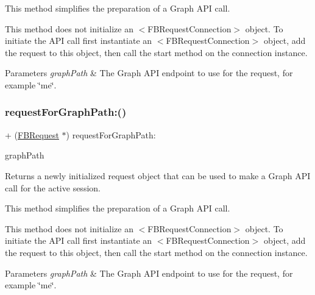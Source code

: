 This method simplifies the preparation of a Graph A\+PI call.

This method does not initialize an $<$\+F\+B\+Request\+Connection$>$ object. To initiate the A\+PI call first instantiate an $<$\+F\+B\+Request\+Connection$>$ object, add the request to this object, then call the {\ttfamily start} method on the connection instance.


\begin{DoxyParams}{Parameters}
{\em graph\+Path} & The Graph A\+PI endpoint to use for the request, for example \char`\"{}me\char`\"{}. \\
\hline
\end{DoxyParams}
\mbox{\label{interfaceFBRequest_a33356f35896b2f50d96ed24c8ddf5841}} 
\subsubsection{\texorpdfstring{request\+For\+Graph\+Path\+:()}{requestForGraphPath:()}\hspace{0.1cm}{\footnotesize\ttfamily [2/5]}}
{\footnotesize\ttfamily + (\hyperlink{interfaceFBRequest}{F\+B\+Request} $\ast$) request\+For\+Graph\+Path\+: \begin{DoxyParamCaption}\item[{(N\+S\+String $\ast$)}]{graph\+Path }\end{DoxyParamCaption}}

Returns a newly initialized request object that can be used to make a Graph A\+PI call for the active session.

This method simplifies the preparation of a Graph A\+PI call.

This method does not initialize an $<$\+F\+B\+Request\+Connection$>$ object. To initiate the A\+PI call first instantiate an $<$\+F\+B\+Request\+Connection$>$ object, add the request to this object, then call the {\ttfamily start} method on the connection instance.


\begin{DoxyParams}{Parameters}
{\em graph\+Path} & The Graph A\+PI endpoint to use for the request, for example \char`\"{}me\char`\"{}. \\
\hline
\end{DoxyParams}
\mbox{\label{interfaceFBRequest_a33356f35896b2f50d96ed24c8ddf5841}} 
